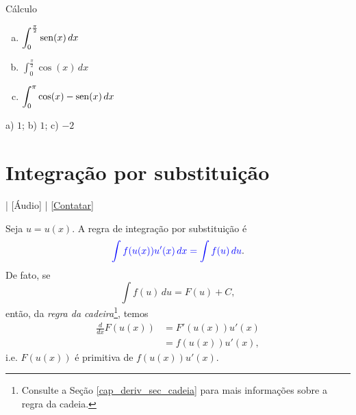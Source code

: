 \begin{exer}
  Cálculo
  \begin{enumerate}[a)]
  \item $\displaystyle \int_0^{\frac{\pi}{2}}\operatorname{sen}(x)\,dx$
  \item $\displaystyle \int_0^{\frac{\pi}{2}}\cos(x)\,dx$
  \item $\displaystyle \int_0^{\pi}\cos(x)-\operatorname{sen}(x)\,dx$
  \end{enumerate}
\end{exer}
\begin{resp}
  a) $1$; b) $1$; c) $-2$
\end{resp}

\section{Integração por substituição}\label{cap_int_sec_subs}

\begin{flushright}
  [Vídeo] | [Áudio] | \href{https://phkonzen.github.io/notas/contato.html}{[Contatar]}
\end{flushright}

Seja $u = u(x)$. A regra de integração por substituição é
\begin{equation}
  {\color{blue}\int f(u(x))u'(x)\,dx = \int f(u)\,du}.
\end{equation}
De fato, se
\begin{equation}
  \int f(u)\,du = F(u) + C,
\end{equation}
então, da \emph{regra da cadeira}\footnote{Consulte a Seção \ref{cap_deriv_sec_cadeia} para mais informações sobre a regra da cadeia.}, temos
\begin{align}
  \frac{d}{dx}F(u(x)) &= F'(u(x))u'(x) \\
                      &= f(u(x))u'(x),
\end{align}
i.e. $F(u(x))$ é primitiva de $f(u(x))u'(x)$.

